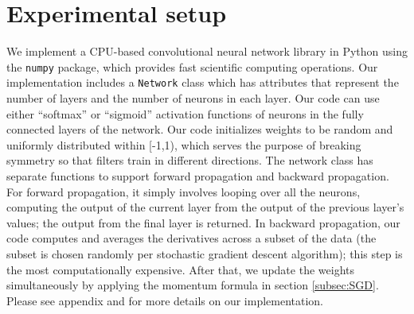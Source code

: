 \documentclass[10pt,twocolumn]{article}
\begin{document}
\section{Experimental setup} \label{sec:evalcnn}

We implement a CPU-based convolutional neural network library \cite{git:cnn} in Python using the \texttt{numpy} package, which provides fast scientific computing operations. Our implementation includes a \texttt{Network} class which has attributes that represent the number of layers and the number of neurons in each layer. Our code can use either ``softmax'' or ``sigmoid'' activation functions of neurons in the fully connected layers of the network. Our code initializes weights to be random and uniformly distributed within [-1,1), which serves the purpose of breaking symmetry so that filters train in different directions. The network class has separate functions to support forward propagation and backward propagation. For forward propagation, it simply involves looping over all the neurons, computing the output of the current layer from the output of the previous layer's values; the output from the final layer is returned. In backward propagation, our code computes and averages the derivatives across a subset of the data (the subset is chosen randomly per stochastic gradient descent algorithm); this step is the most computationally expensive. After that, we update the weights simultaneously by applying the momentum formula in section \ref{subsec:SGD}. Please see appendix and \cite{git:cnn} for more details on our implementation.
\end{document}
